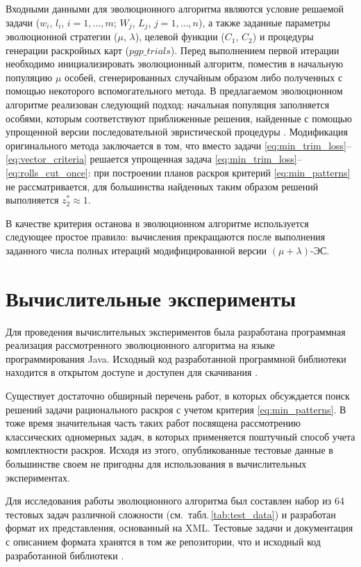 \documentclass[12pt]{article}
\begin{document}
Входными данными для эволюционного алгоритма являются условие решаемой задачи 
($w_i$, $l_i$, $i=1,\ldots,m$; $W_j$, $L_j$, $j=1,\ldots,n$), а также заданные 
параметры эволюционной стратегии ($\mu$, $\lambda$), целевой функции 
($C_1$, $C_2$) и процедуры генерации раскройных карт ($pgp\_trials$). Перед 
выполнением первой итерации необходимо инициализировать эволюционный алгоритм, 
поместив в начальную популяцию $\mu$ особей, сгенерированных случайным образом 
либо полученных с помощью некоторого вспомогательного метода. В предлагаемом 
эволюционном алгоритме реализован следующий подход: начальная популяция 
заполняется особями, которым соответствуют приближенные решения, найденные 
с помощью упрощенной версии последовательной эвристической процедуры 
\cite{haessler88}. 
Модификация оригинального метода 
\cite{haessler88} 
заключается в том, что вместо задачи 
\eqref{eq:min_trim_loss}--\eqref{eq:vector_criteria} 
решается упрощенная задача 
\eqref{eq:min_trim_loss}--\eqref{eq:rolls_cut_once}: 
при построении планов раскроя 
критерий 
\eqref{eq:min_patterns} 
не рассматривается, для большинства найденных таким образом 
решений выполняется $z_2^* \approx 1$.

В качестве критерия останова в эволюционном алгоритме используется следующее 
простое правило: вычисления прекращаются после выполнения заданного числа 
полных итераций модифицированной версии $(\mu + \lambda)$-ЭС.


\section{Вычислительные эксперименты}

Для проведения вычислительных экспериментов была разработана программная 
реализация рассмотренного эволюционного алгоритма на языке программирования 
Java. Исходный код разработанной программной библиотеки находится в открытом 
доступе и доступен для скачивания
\cite{github}.

Существует достаточно обширный перечень работ, в которых обсуждается поиск 
решений задачи рационального раскроя с учетом критерия 
\eqref{eq:min_patterns}. 
В тоже время 
значительная часть таких работ посвящена рассмотрению классических одномерных 
задач, в которых применяется поштучный способ учета комплектности раскроя. 
Исходя из этого, опубликованные тестовые данные в большинстве своем не 
пригодны для использования в вычислительных экспериментах.

Для исследования работы эволюционного алгоритма был составлен набор из 64 
тестовых задач различной сложности 
(см.~табл.\,\ref{tab:test_data}) 
и разработан формат их 
представления, основанный на XML. Тестовые задачи и документация с описанием 
формата хранятся в том же репозитории, что и исходный код разработанной 
библиотеки 
\cite{github}.
\end{document}
